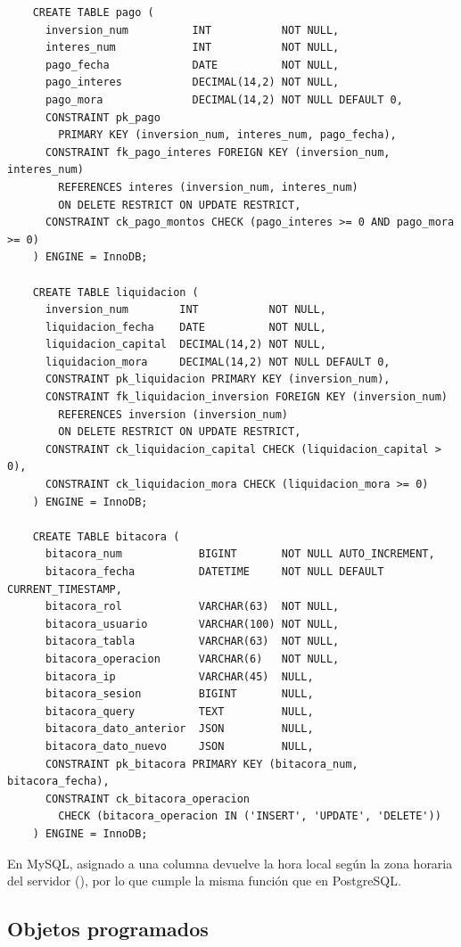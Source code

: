 \begin{verbatim}
	CREATE TABLE pago (
	  inversion_num          INT           NOT NULL,
	  interes_num            INT           NOT NULL,
	  pago_fecha             DATE          NOT NULL,
	  pago_interes           DECIMAL(14,2) NOT NULL,
	  pago_mora              DECIMAL(14,2) NOT NULL DEFAULT 0,
	  CONSTRAINT pk_pago
	    PRIMARY KEY (inversion_num, interes_num, pago_fecha),
	  CONSTRAINT fk_pago_interes FOREIGN KEY (inversion_num, interes_num)
	    REFERENCES interes (inversion_num, interes_num)
	    ON DELETE RESTRICT ON UPDATE RESTRICT,
	  CONSTRAINT ck_pago_montos CHECK (pago_interes >= 0 AND pago_mora >= 0)
	) ENGINE = InnoDB;

	CREATE TABLE liquidacion (
	  inversion_num        INT           NOT NULL,
	  liquidacion_fecha    DATE          NOT NULL,
	  liquidacion_capital  DECIMAL(14,2) NOT NULL,
	  liquidacion_mora     DECIMAL(14,2) NOT NULL DEFAULT 0,
	  CONSTRAINT pk_liquidacion PRIMARY KEY (inversion_num),
	  CONSTRAINT fk_liquidacion_inversion FOREIGN KEY (inversion_num)
	    REFERENCES inversion (inversion_num)
	    ON DELETE RESTRICT ON UPDATE RESTRICT,
	  CONSTRAINT ck_liquidacion_capital CHECK (liquidacion_capital > 0),
	  CONSTRAINT ck_liquidacion_mora CHECK (liquidacion_mora >= 0)
	) ENGINE = InnoDB;

	CREATE TABLE bitacora (
	  bitacora_num            BIGINT       NOT NULL AUTO_INCREMENT,
	  bitacora_fecha          DATETIME     NOT NULL DEFAULT CURRENT_TIMESTAMP,
	  bitacora_rol            VARCHAR(63)  NOT NULL,
	  bitacora_usuario        VARCHAR(100) NOT NULL,
	  bitacora_tabla          VARCHAR(63)  NOT NULL,
	  bitacora_operacion      VARCHAR(6)   NOT NULL,
	  bitacora_ip             VARCHAR(45)  NULL,
	  bitacora_sesion         BIGINT       NULL,
	  bitacora_query          TEXT         NULL,
	  bitacora_dato_anterior  JSON         NULL,
	  bitacora_dato_nuevo     JSON         NULL,
	  CONSTRAINT pk_bitacora PRIMARY KEY (bitacora_num, bitacora_fecha),
	  CONSTRAINT ck_bitacora_operacion
	    CHECK (bitacora_operacion IN ('INSERT', 'UPDATE', 'DELETE'))
	) ENGINE = InnoDB;
\end{verbatim}

En MySQL,  asignado a una columna  devuelve la hora local según la zona horaria del servidor (), por lo que cumple la misma función que  en PostgreSQL.

\subsection{Objetos programados}

